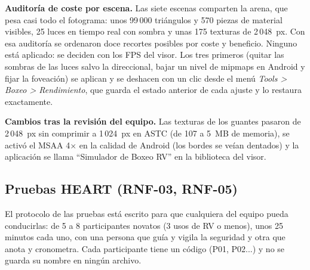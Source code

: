 \textbf{Auditoría de coste por escena.} Las siete escenas comparten la arena, que pesa casi todo el fotograma: unos 99\,000 triángulos y 570 piezas de material visibles, 25 luces en tiempo real con sombra y unas 175 texturas de 2\,048~px. Con esa auditoría se ordenaron doce recortes posibles por coste y beneficio. Ninguno está aplicado: se deciden con los FPS del visor. Los tres primeros (quitar las sombras de las luces salvo la direccional, bajar un nivel de mipmaps en Android y fijar la foveación) se aplican y se deshacen con un clic desde el menú \emph{Tools > Boxeo > Rendimiento}, que guarda el estado anterior de cada ajuste y lo restaura exactamente.

\textbf{Cambios tras la revisión del equipo.} Las texturas de los guantes pasaron de 2\,048~px sin comprimir a 1\,024~px en ASTC (de 107 a 5~MB de memoria), se activó el MSAA 4$\times$ en la calidad de Android (los bordes se veían dentados) y la aplicación se llama ``Simulador de Boxeo RV'' en la biblioteca del visor.

\begin{table}[H]
\centering
\caption{Rendimiento medido en Meta Quest 2 (se completa en la sesión con visor).}
\end{table}

\subsection{Pruebas HEART (RNF-03, RNF-05)}
\label{sec:heart}
El protocolo de las pruebas está escrito para que cualquiera del equipo pueda conducirlas: de 5 a 8 participantes novatos (3 usos de RV o menos), unos 25 minutos cada uno, con una persona que guía y vigila la seguridad y otra que anota y cronometra. Cada participante tiene un código (P01, P02...) y no se guarda su nombre en ningún archivo.

